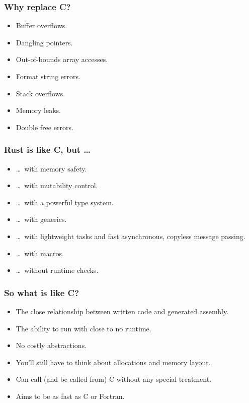 \documentclass{beamer}
\begin{document}
\begin{frame}
  \frametitle{Why replace C?}

  \begin{itemize}
    \item Buffer overflows.
    \item Dangling pointers.
    \item Out-of-bounds array accesses.
    \item Format string errors.
    \item Stack overflows.
    \item Memory leaks.
    \item Double free errors.
  \end{itemize}
\end{frame}



\begin{frame}
  \frametitle{Rust is like C, but \ldots}

  \begin{itemize}[<+->]
    \item \ldots\ with memory safety.
    \item \ldots\ with mutability control.
    \item \ldots\ with a powerful type system.
    \item \ldots\ with generics.
    \item \ldots\ with lightweight tasks and fast asynchronous, copyless message passing.
    \item \ldots\ with macros. \pause
    \item \ldots\ without runtime checks.
  \end{itemize}
\end{frame}



\begin{frame}
  \frametitle{So what is like C?}

  \begin{itemize}
    \item The close relationship between written code and generated assembly.
    \item The ability to run with close to no runtime.
    \item No costly abstractions.
    \item You'll still have to think about allocations and memory layout.
    \item Can call (and be called from) C without any special treatment.
    \item Aims to be as fast as C or Fortran.
  \end{itemize}
\end{frame}
\end{document}
